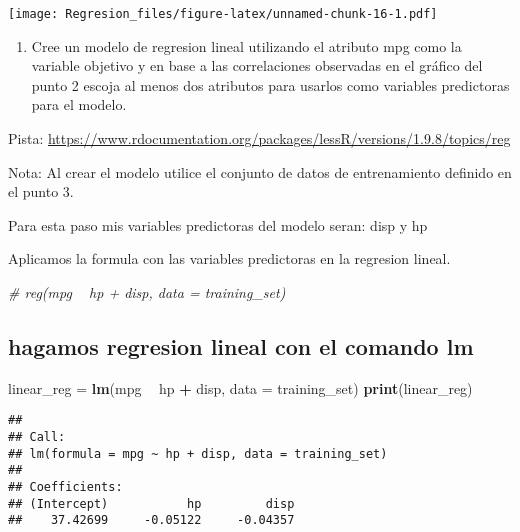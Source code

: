 \documentclass[]{article}
\newenvironment{Shaded}{\begin{snugshade}}{\end{snugshade}}
\newcommand{\CommentTok}[1]{\textcolor[rgb]{0.56,0.35,0.01}{\textit{#1}}}
\newcommand{\DataTypeTok}[1]{\textcolor[rgb]{0.13,0.29,0.53}{#1}}
\newcommand{\KeywordTok}[1]{\textcolor[rgb]{0.13,0.29,0.53}{\textbf{#1}}}
\newcommand{\NormalTok}[1]{#1}
\newcommand{\OperatorTok}[1]{\textcolor[rgb]{0.81,0.36,0.00}{\textbf{#1}}}
\newcommand{\StringTok}[1]{\textcolor[rgb]{0.31,0.60,0.02}{#1}}
\providecommand{\tightlist}{%
  \setlength{\itemsep}{0pt}\setlength{\parskip}{0pt}}
\begin{document}
\texttt{[image: Regresion\_files/figure-latex/unnamed-chunk-16-1.pdf]}

\begin{enumerate}
\def\labelenumi{\arabic{enumi}.}
\setcounter{enumi}{3}
\tightlist
\item
  Cree un modelo de regresion lineal utilizando el atributo mpg como la
  variable objetivo y en base a las correlaciones observadas en el
  gráfico del punto 2 escoja al menos dos atributos para usarlos como
  variables predictoras para el modelo.
\end{enumerate}

Pista:
\url{https://www.rdocumentation.org/packages/lessR/versions/1.9.8/topics/reg}

Nota: Al crear el modelo utilice el conjunto de datos de entrenamiento
definido en el punto 3.

Para esta paso mis variables predictoras del modelo seran: disp y hp

Aplicamos la formula con las variables predictoras en la regresion
lineal.

\begin{Shaded}
\begin{Highlighting}[]
\CommentTok{# reg(mpg ~ hp + disp, data = training_set)}
\end{Highlighting}
\end{Shaded}

\hypertarget{hagamos-regresion-lineal-con-el-comando-lm}{%
\subsection{hagamos regresion lineal con el comando
lm}\label{hagamos-regresion-lineal-con-el-comando-lm}}

\begin{Shaded}
\begin{Highlighting}[]
\NormalTok{linear_reg =}\StringTok{ }\KeywordTok{lm}\NormalTok{(mpg }\OperatorTok{~}\StringTok{ }\NormalTok{hp }\OperatorTok{+}\StringTok{ }\NormalTok{disp, }\DataTypeTok{data =}\NormalTok{ training_set)}
\KeywordTok{print}\NormalTok{(linear_reg)}
\end{Highlighting}
\end{Shaded}

\begin{verbatim}
## 
## Call:
## lm(formula = mpg ~ hp + disp, data = training_set)
## 
## Coefficients:
## (Intercept)           hp         disp  
##    37.42699     -0.05122     -0.04357
\end{verbatim}
\end{document}
